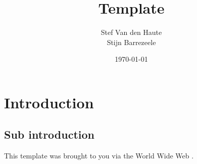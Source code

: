 \documentclass[a4paper, 11pt]{article}
\title{Template}
\author{Stef Van den Haute\\
        \hspace{2cm}Stijn Barrezeele}
\date{\monthyeardate\today}
\begin{document}
\maketitle
\newpage

\tableofcontents
\newpage

\setlength\parindent{0pt} %

\section{Introduction}
\subsection{Sub introduction}

This template was brought to you via the World Wide Web \cite{BernersLee1990InformationMA}.

\newpage

\end{document}
